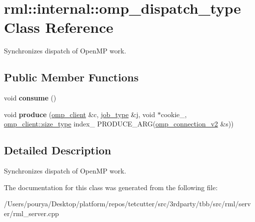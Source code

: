 \hypertarget{classrml_1_1internal_1_1omp__dispatch__type}{}\section{rml\+:\+:internal\+:\+:omp\+\_\+dispatch\+\_\+type Class Reference}
\label{classrml_1_1internal_1_1omp__dispatch__type}


Synchronizes dispatch of Open\+M\+P work.  


\subsection*{Public Member Functions}
\begin{DoxyCompactItemize}
\item 
\hypertarget{classrml_1_1internal_1_1omp__dispatch__type_aaded6373948562e801d40b3e8488b4be}{}void {\bfseries consume} ()\label{classrml_1_1internal_1_1omp__dispatch__type_aaded6373948562e801d40b3e8488b4be}

\item 
\hypertarget{classrml_1_1internal_1_1omp__dispatch__type_ae666ca477dc05199576756171b3ca86b}{}void {\bfseries produce} (\hyperlink{class____kmp_1_1rml_1_1omp__client}{omp\+\_\+client} \&c, \hyperlink{classrml_1_1job}{job\+\_\+type} \&j, void $\ast$cookie\+\_\+, \hyperlink{classrml_1_1client_a0dc06ede570f7ee6d3021862cb71119f}{omp\+\_\+client\+::size\+\_\+type} index\+\_\+ P\+R\+O\+D\+U\+C\+E\+\_\+\+A\+R\+G(\hyperlink{classrml_1_1internal_1_1omp__connection__v2}{omp\+\_\+connection\+\_\+v2} \&s))\label{classrml_1_1internal_1_1omp__dispatch__type_ae666ca477dc05199576756171b3ca86b}

\end{DoxyCompactItemize}


\subsection{Detailed Description}
Synchronizes dispatch of Open\+M\+P work. 

The documentation for this class was generated from the following file\+:\begin{DoxyCompactItemize}
\item 
/\+Users/pourya/\+Desktop/platform/repos/tetcutter/src/3rdparty/tbb/src/rml/server/rml\+\_\+server.\+cpp\end{DoxyCompactItemize}
